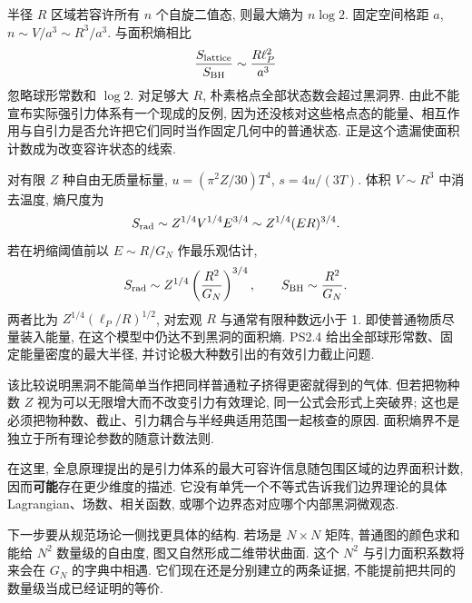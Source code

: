 \begin{example}
半径 $R$ 区域若容许所有 $n$ 个自旋二值态, 则最大熵为 $n\log2$. 固定空间格距 $a$, $n\sim V/a^3\sim R^3/a^3$. 与面积熵相比
\[
\frac{S_{\rm lattice}}{S_{\rm BH}}
\sim\frac{R\ell_P^2}{a^3}
\]
忽略球形常数和 $\log2$. 对足够大 $R$, 朴素格点全部状态数会超过黑洞界. 由此不能宣布实际强引力体系有一个现成的反例, 因为还没核对这些格点态的能量、相互作用与自引力是否允许把它们同时当作固定几何中的普通状态. 正是这个遗漏使面积计数成为改变容许状态的线索.
\end{example}

对有限 $Z$ 种自由无质量标量, $u=(\pi^2Z/30)T^4$, $s=4u/(3T)$. 体积 $V\sim R^3$ 中消去温度, 熵尺度为
\[
S_{\rm rad}\sim Z^{1/4}V^{1/4}E^{3/4}
\sim Z^{1/4}(ER)^{3/4}.
\]
若在坍缩阈值前以 $E\sim R/G_N$ 作最乐观估计,
\[
S_{\rm rad}\sim Z^{1/4}\left(\frac{R^2}{G_N}\right)^{3/4},
\qquad S_{\rm BH}\sim\frac{R^2}{G_N}.
\]
两者比为 $Z^{1/4}(\ell_P/R)^{1/2}$, 对宏观 $R$ 与通常有限种数远小于 1. 即使普通物质尽量装入能量, 在这个模型中仍达不到黑洞的面积熵. PS2.4 给出全部球形常数、固定能量密度的最大半径, 并讨论极大种数引出的有效引力截止问题.

该比较说明黑洞不能简单当作把同样普通粒子挤得更密就得到的气体. 但若把物种数 $Z$ 视为可以无限增大而不改变引力有效理论, 同一公式会形式上突破界; 这也是必须把物种数、截止、引力耦合与半经典适用范围一起核查的原因. 面积熵界不是独立于所有理论参数的随意计数法则.

在这里, 全息原理提出的是引力体系的最大可容许信息随包围区域的边界面积计数, 因而\textbf{可能}存在更少维度的描述. 它没有单凭一个不等式告诉我们边界理论的具体 Lagrangian、场数、相关函数, 或哪个边界态对应哪个内部黑洞微观态.

下一步要从规范场论一侧找更具体的结构. 若场是 $N\times N$ 矩阵, 普通图的颜色求和能给 $N^2$ 数量级的自由度, 图又自然形成二维带状曲面. 这个 $N^2$ 与引力面积系数将来会在 $G_N$ 的字典中相遇. 它们现在还是分别建立的两条证据, 不能提前把共同的数量级当成已经证明的等价.
